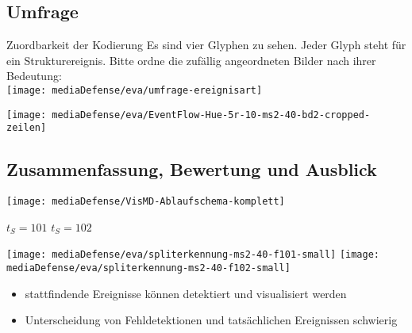 \documentclass[10pt]{beamer}
\begin{document}
\subsection{Umfrage}
\begin{frame}{Zuordbarkeit der Kodierung}
	Es sind vier Glyphen zu sehen. Jeder Glyph steht für ein Strukturereignis. Bitte ordne die zufällig angeordneten Bilder nach ihrer Bedeutung:\\
	\texttt{[image: mediaDefense/eva/umfrage-ereignisart]}
\end{frame}

%
%
\begin{wideframe}
	\texttt{[image: mediaDefense/eva/EventFlow-Hue-5r-10-ms2-40-bd2-cropped-zeilen]}
\end{wideframe}

\subsection{Zusammenfassung, Bewertung und Ausblick}
\begin{wideframe}
	\texttt{[image: mediaDefense/VisMD-Ablaufschema-komplett]}
\end{wideframe}

\begin{wideframe}
	{\scriptsize $t_S=101$}
	\hspace{.41\textwidth}
	{\scriptsize $t_S=102$}
	
	\texttt{[image: mediaDefense/eva/spliterkennung-ms2-40-f101-small]}
	\hspace{.01\textwidth}
	\texttt{[image: mediaDefense/eva/spliterkennung-ms2-40-f102-small]}
	\begin{itemize}[<+->]
		\item stattfindende Ereignisse können detektiert und visualisiert werden
		\item Unterscheidung von Fehldetektionen und tatsächlichen Ereignissen schwierig
	\end{itemize}
\end{wideframe}
\end{document}
